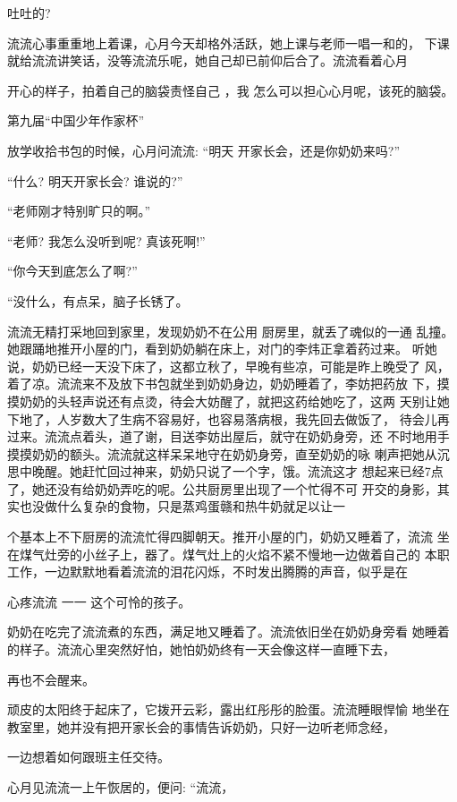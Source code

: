 \documentclass{article}
\begin{document}
吐吐的? 

流流心事重重地上着课，心月今天却格外活跃，她上课与老师一唱一和的，
下课就给流流讲笑话，没等流流乐呢，她自己却已前仰后合了。流流看着心月
\newpage

开心的样子，拍着自己的脑袋责怪自己 ，我
怎么可以担心心月呢，该死的脑袋。 



第九届“中国少年作家杯” 


放学收拾书包的时候，心月问流流: “明天
开家长会，还是你奶奶来吗?” 


“什么? 明天开家长会? 谁说的?” 


“老师刚才特别旷只的啊。” 

“老师? 我怎么没听到呢? 真该死啊!”


“你今天到底怎么了啊?” 


“没什么，有点呆，脑子长锈了。 

流流无精打采地回到家里，发现奶奶不在公用
\newpage
厨房里，就丢了魂似的一通
乱撞。她跟踊地推开小屋的门，看到奶奶躺在床上，对门的李炜正拿着药过来。
听她说，奶奶已经一天没下床了，这都立秋了，早晚有些凉，可能是昨上晚受了
风， 着了凉。流流来不及放下书包就坐到奶奶身边，奶奶睡着了，李妨把药放
下，摸摸奶奶的头轻声说还有点烫，待会大妨醒了，就把这药给她吃了，这两
天别让她下地了，人岁数大了生病不容易好，也容易落病根，我先回去做饭了，
待会儿再过来。流流点着头，道了谢，目送李妨出屋后，就守在奶奶身旁，还
不时地用手摸摸奶奶的额头。流流就这样呆呆地守在奶奶身旁，直至奶奶的咏
喇声把她从沉思中晚醒。她赶忙回过神来，奶奶只说了一个字，饿。流流这才
想起来已经7点了，她还没有给奶奶弄吃的呢。公共厨房里出现了一个忙得不可
开交的身影，其实也没做什么复杂的食物，只是蒸鸡蛋赣和热牛奶就足以让一
\newpage

个基本上不下厨房的流流忙得四脚朝天。推开小屋的门，奶奶又睡着了，流流
坐在煤气灶旁的小丝子上，器了。煤气灶上的火焰不紧不慢地一边做着自己的
本职工作，一边默默地看着流流的泪花闪烁，不时发出腾腾的声音，似乎是在

心疼流流 一一 这个可怜的孩子。 

奶奶在吃完了流流煮的东西，满足地又睡着了。流流依旧坐在奶奶身旁看
她睡着的样子。流流心里突然好怕，她怕奶奶终有一天会像这样一直睡下去，

再也不会醒来。 

顽皮的太阳终于起床了，它拨开云彩，露出红彤彤的脸蛋。流流睡眼悍愉
地坐在教室里，她并没有把开家长会的事情告诉奶奶，只好一边听老师念经，

一边想着如何跟班主任交待。 

心月见流流一上午恢居的，便问: “流流，
\newpage
\end{document}
